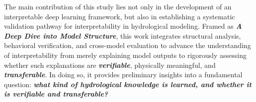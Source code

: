 The main contribution of this study lies not only in the development of an interpretable deep learning framework, but also in establishing a systematic validation pathway for interpretability in hydrological modeling. Framed as \textbf{\textit{A Deep Dive into Model Structure}}, this work integrates structural analysis, behavioral verification, and cross-model evaluation to advance the understanding of interpretability from merely explaining model outputs to rigorously assessing whether such explanations are \textbf{\textit{verifiable}}, physically meaningful, and \textbf{\textit{transferable}}. In doing so, it provides preliminary insights into a fundamental question: \textbf{\emph{what kind of hydrological knowledge is learned, and whether it is verifiable and transferable?}}